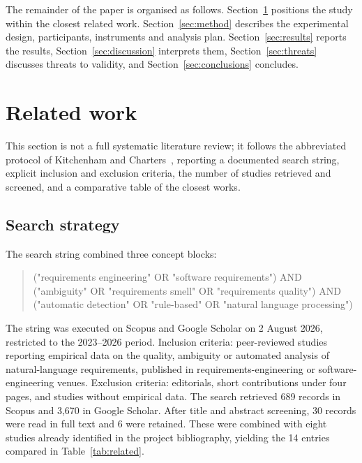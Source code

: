 \documentclass[pdflatex,sn-mathphys-num]{sn-jnl}
\theoremstyle{thmstyleone}%
\theoremstyle{thmstyletwo}%
\theoremstyle{thmstylethree}%
\begin{document}
	The remainder of the paper is organised as follows. Section~\ref{sec:related}
	positions the study within the closest related work. Section~\ref{sec:method}
	describes the experimental design, participants, instruments and analysis plan.
	Section~\ref{sec:results} reports the results, Section~\ref{sec:discussion}
	interprets them, Section~\ref{sec:threats} discusses threats to validity, and
	Section~\ref{sec:conclusions} concludes.
	
	
	\section{Related work}\label{sec:related}
	
	This section is not a full systematic literature review; it follows the
	abbreviated protocol of Kitchenham and Charters~\cite{kitchenham2007},
	reporting a documented search string, explicit inclusion and exclusion criteria,
	the number of studies retrieved and screened, and a comparative table of the
	closest works.
	
	\subsection{Search strategy}\label{subsec:search}
	
	The search string combined three concept blocks:
	
	\begin{quote}\small\ttfamily
		("requirements engineering" OR "software requirements") AND
		("ambiguity" OR "requirements smell" OR "requirements quality") AND
		("automatic detection" OR "rule-based" OR "natural language processing")
	\end{quote}
	
	The string was executed on Scopus and Google Scholar on 2 August 2026,
	restricted to the 2023--2026 period. Inclusion criteria: peer-reviewed
	studies reporting empirical data on the quality, ambiguity or automated analysis
	of natural-language requirements, published in requirements-engineering or
	software-engineering venues. Exclusion criteria: editorials, short contributions
	under four pages, and studies without empirical data. The search retrieved
	689 records in Scopus and 3,670 in Google Scholar. After title and abstract
	screening, 30 records were read in full text and 6 were retained. These were
	combined with eight studies already identified in the project bibliography,
	yielding the 14 entries compared in Table~\ref{tab:related}.
	
\end{document}
